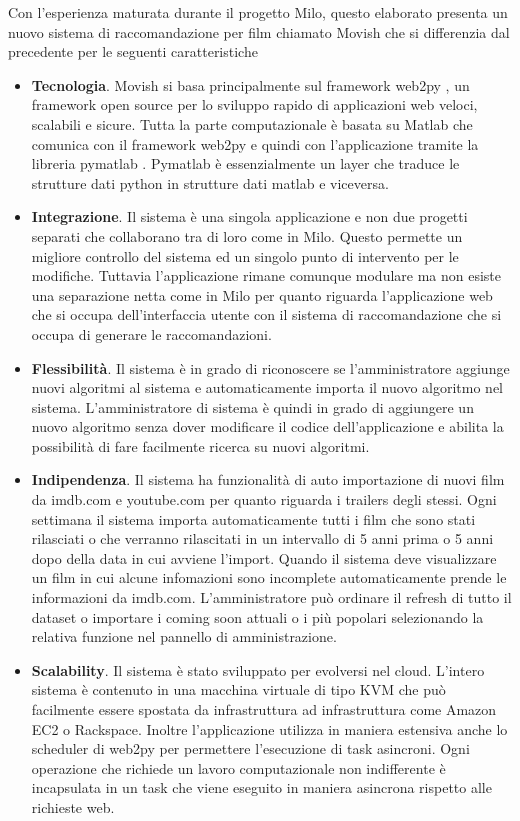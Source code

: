 Con l'esperienza maturata durante il progetto Milo, questo elaborato presenta un nuovo sistema di raccomandazione per film chiamato Movish che si differenzia dal precedente per le seguenti caratteristiche
\begin{itemize}
\item \textbf{Tecnologia}. Movish si basa principalmente sul framework web2py \cite{web2py}, un framework open source per lo sviluppo rapido di applicazioni web veloci, scalabili e sicure. Tutta la parte computazionale \`e basata su Matlab \cite{matlab} che comunica con il framework web2py e quindi con l'applicazione tramite la libreria pymatlab \cite{pymatlab}. Pymatlab \`e essenzialmente un layer che traduce le strutture dati python in strutture dati matlab e viceversa.
\item \textbf{Integrazione}. Il sistema \`e una singola applicazione e non due progetti separati che collaborano tra di loro come in Milo. Questo permette un migliore controllo del sistema ed un singolo punto di intervento per le modifiche. Tuttavia l'applicazione rimane comunque modulare ma non esiste una separazione netta come in Milo per quanto riguarda l'applicazione web che si occupa dell'interfaccia utente con il sistema di raccomandazione che si occupa di generare le raccomandazioni.
\item \textbf{Flessibilit\`a}. Il sistema \`e in grado di riconoscere se l'amministratore aggiunge nuovi algoritmi al sistema e automaticamente importa il nuovo algoritmo nel sistema. L'amministratore di sistema \`e quindi in grado di aggiungere un nuovo algoritmo senza dover modificare il codice dell'applicazione e abilita la possibilit\`a di fare facilmente ricerca su nuovi algoritmi. 
\item \textbf{Indipendenza}. Il sistema ha funzionalit\`a di auto importazione di nuovi film da imdb.com e youtube.com per quanto riguarda i trailers degli stessi. Ogni settimana il sistema importa automaticamente tutti i film che sono stati rilasciati o che verranno rilascitati in un intervallo di 5 anni prima o 5 anni dopo della data in cui avviene l'import. Quando il sistema deve visualizzare un film in cui alcune infomazioni sono incomplete automaticamente prende le informazioni da imdb.com. L'amministratore pu\`o ordinare il refresh di tutto il dataset o importare i coming soon attuali o i pi\`u popolari selezionando la relativa funzione nel pannello di amministrazione.
\item \textbf{Scalability}. Il sistema \`e stato sviluppato per evolversi nel cloud. L'intero sistema \`e contenuto in una macchina virtuale di tipo KVM che pu\`o facilmente essere spostata da infrastruttura ad infrastruttura come Amazon EC2 o Rackspace. Inoltre l'applicazione utilizza in maniera estensiva anche lo scheduler di web2py per permettere l'esecuzione di task asincroni. Ogni operazione che richiede un lavoro computazionale non indifferente \`e incapsulata in un task che viene eseguito in maniera asincrona rispetto alle richieste web.
\end{itemize}

